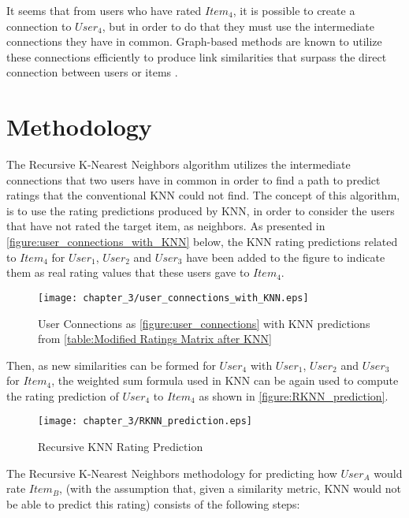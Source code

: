 It seems that from users who have rated $Item_4$, it is possible to create a connection to $User_4$, but in
order to do that they must use the intermediate connections they have in common. Graph-based
methods are known to utilize these connections efficiently to produce link similarities that
surpass the direct connection between users or items \citep{Ricci,Aggarwal}.
\section{Methodology}
The Recursive K-Nearest Neighbors algorithm utilizes the intermediate connections that two users
have in common in order to find a path to predict ratings that the conventional KNN could not find.
The concept of this algorithm, is to use the rating predictions produced by KNN, in order
to consider the users that have not rated the target item, as neighbors. As presented in
\autoref{figure:user_connections_with_KNN} below,
the KNN rating predictions related to $Item_4$ for $User_1$, $User_2$ and $User_3$ have been
added to the figure to indicate them as real rating values that these users gave to $Item_4$.
\begin{figure}[H]
\centering
\texttt{[image: chapter\_3/user\_connections\_with\_KNN.eps]}
\caption{User Connections as \autoref{figure:user_connections} with KNN predictions from \autoref{table:Modified Ratings Matrix after KNN}}
\label{figure:user_connections_with_KNN}
\end{figure}
Then, as new similarities can be formed for $User_4$ with $User_1$, $User_2$ and $User_3$ for $Item_4$, the weighted sum formula used in KNN can be
again used to compute the rating prediction of $User_4$ to $Item_4$ as shown in \autoref{figure:RKNN_prediction}.\\
\begin{figure}[H]
\centering
\texttt{[image: chapter\_3/RKNN\_prediction.eps]}
\caption{Recursive KNN Rating Prediction}
\label{figure:RKNN_prediction}
\end{figure}
The Recursive K-Nearest Neighbors methodology for predicting how $User_A$ would rate $Item_B$,
(with the assumption that, given a similarity metric, KNN would not be able to predict this rating)
consists of the following steps:
